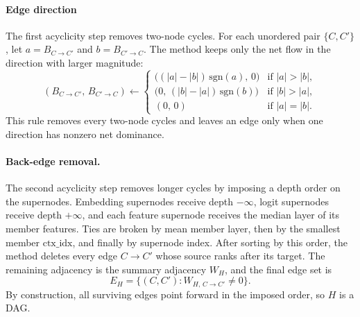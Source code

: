 \documentclass[../main.tex]{subfiles}
\begin{document}
\paragraph{Edge direction}
The first acyclicity step removes two-node cycles. For each unordered pair
$\{C,C'\}$, let $a = B_{C \to C'}$ and $b = B_{C' \to C}$. The method keeps only
the net flow in the direction with larger magnitude:
\begin{equation}
(B_{C \to C'},\, B_{C' \to C}) \leftarrow
\begin{cases}
\bigl((|a|-|b|)\,\mathrm{sgn}(a),\,0\bigr) & \text{if } |a| > |b|, \\[2pt]
\bigl(0,\,(|b|-|a|)\,\mathrm{sgn}(b)\bigr) & \text{if } |b| > |a|, \\[2pt]
(0,\,0) & \text{if } |a| = |b|.
\end{cases}
\label{eq:edgedir}
\end{equation}
This rule removes every two-node cycles and leaves an edge only when one
direction has nonzero net dominance.

\paragraph{Back-edge removal.}
The second acyclicity step removes longer cycles by imposing a depth order on the
supernodes. Embedding supernodes receive depth $-\infty$, logit supernodes receive
depth $+\infty$, and each feature supernode receives the median layer of its
member features. Ties are broken by mean member layer, then by the smallest member
$\text{ctx\_idx}$, and finally by supernode index. After sorting by this order, the
method deletes every edge $C \to C'$ whose source ranks after its target. The
remaining adjacency is the summary adjacency $W_H$, and the final edge set is
\[
E_H = \{(C,C') : W_{H,\,C \to C'} \ne 0\}.
\]
By construction, all surviving edges point forward in the imposed order, so $H$ is
a DAG.
\end{document}
